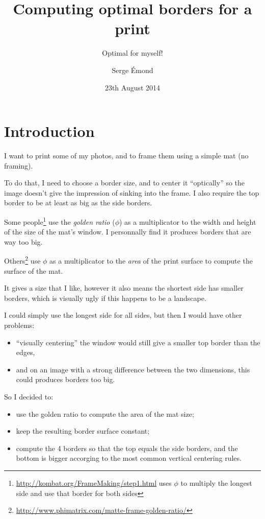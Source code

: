 \documentclass[
    paper=letter,
    parskip=half-,
    DIV=10,
]{scrreprt}
\begin{document}
\subject{Reflection}
\title{Computing optimal borders for a print} \subtitle{Optimal for myself!}
\author{Serge Émond}
\date{23th August 2014}
\maketitle

\chapter{Introduction}

    I want to print some of my photos, and to frame them using a simple mat (no framing).

    To do that, I need to choose a border size, and to center it “optically” so the image doesn’t give the impression of sinking into the frame. I also require the top border to be at least as big as the side borders.

    Some people\footnote{\url{http://kombat.org/FrameMaking/step1.html} uses $\phi$ to multiply the longest side and use that border for both sides} use the \emph{golden ratio} ($\phi$) as a multiplicator to the width and height of the size of the mat’s window. I personnally find it produces borders that are way too big.

    Others\footnote{\url{http://www.phimatrix.com/matte-frame-golden-ratio/}} use $\phi$ as a multiplicator to the \emph{area} of the print surface to compute the surface of the mat.

    It gives a size that I like, however it also means the shortest side has smaller borders, which is visually ugly if this happens to be a landscape.

    I could simply use the longest side for all sides, but then I would have other problems:
    \begin{itemize}
        \item “visually centering” the window would still give a smaller top border than the edges,
        \item and on an image with a strong difference between the two dimensions, this could produces borders too big.
    \end{itemize}

    So I decided to:

    \begin{itemize}
        \item use the golden ratio to compute the area of the mat size;
        \item keep the resulting border surface constant;
        \item compute the 4 borders so that the top equals the side borders, and the bottom is bigger accorging to the most common vertical centering rules.
    \end{itemize}
\end{document}
